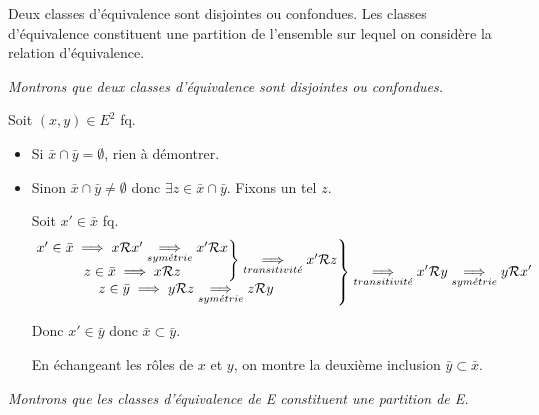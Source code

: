 \documentclass{article}
\renewenvironment{question_kholle}[2][ ]
{
	\subsection{\texorpdfstring{#2}{}}
	\notblank{#1}
	{
		\noindent #1
		\bigbreak
	}
	{}
	\begin{proof}
}
{
	\end{proof}
}
\begin{document}
	\begin{question_kholle}
		[\noindent Soit \Rel une relation d'équivalence sur $E$. \\
		Soit $x \in E$. \\
		La classe de $x$, notée $\bar{x}$, est l'ensemble des éléments de $E$ en relation avec x.
		\begin{equation}
			\bar{x} = \left\{ y \in E \;|\; x \Rel y \right\}
		\end{equation}]
		{Deux classes d'équivalence sont disjointes ou confondues. Les classes d'équivalence constituent une partition de l'ensemble sur lequel on considère la relation d'équivalence.}
		
		\textit{Montrons que deux classes d'équivalence sont disjointes ou confondues.}
		
		Soit $(x, y) \in E^2$ fq.
		\begin{itemize}[label=\textemdash]
			\item Si $\bar{x} \cap \bar{y} = \emptyset$, rien à démontrer.
			\item Sinon $\bar{x} \cap \bar{y} \neq \emptyset$ donc $\exists z \in \bar{x} \cap \bar{y}$. Fixons un tel $z$.

			Soit $x' \in \bar{x}$ fq.
			\begin{equation*}
				\left.
				\begin{matrix}
					\left. \begin{matrix}
						x' \in \bar{x} \implies x \mathcal R x' \underset{sym\acute{e}trie}{\implies} x' \mathcal R x \\
						z \in \bar{x} \implies x \mathcal R z
					\end{matrix}
					\right\} \underset{transitivit\acute{e}}{\implies} x' \mathcal R z \\
					z \in \bar{y} \implies y \mathcal R z \underset{sym\acute{e}trie}{\implies} z \mathcal R y
				\end{matrix}
				\right\} \underset{transitivit\acute{e}}{\implies} x' \mathcal R y
				\underset{sym\acute{e}trie}{\implies} y \mathcal R x'
			\end{equation*}
			
			Donc $x' \in \bar{y}$ donc $\bar{x} \subset \bar{y}$.
			
			En échangeant les rôles de $x$ et $y$, on montre la deuxième inclusion $\bar{y} \subset \bar{x}$.
		\end{itemize}
		\bigbreak
	
		\textit{Montrons que les classes d'équivalence de E constituent une partition de E.}
		

\end{question_kholle}
\end{document}
